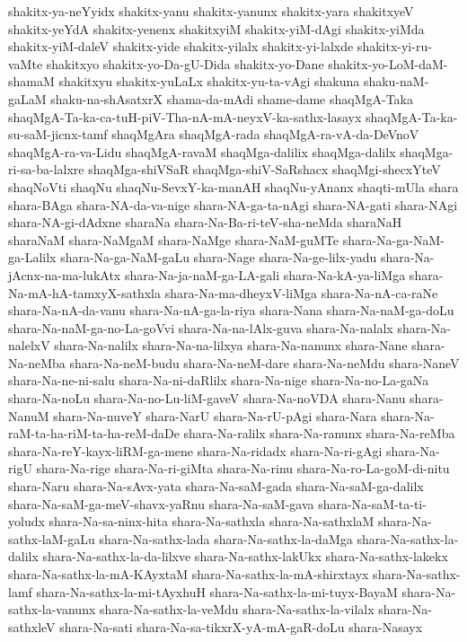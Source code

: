 {shakitx-ya-neYyidx
shakitx-yanu
shakitx-yanunx
shakitx-yara
shakitxyeV
shakitx-yeYdA
shakitx-yenenx
shakitxyiM
shakitx-yiM-dAgi
shakitx-yiMda
shakitx-yiM-daleV
shakitx-yide
shakitx-yilalx
shakitx-yi-lalxde
shakitx-yi-ru-vaMte
shakitxyo
shakitx-yo-Da-gU-Dida
shakitx-yo-Dane
shakitx-yo-LoM-daM-shamaM
shakitxyu
shakitx-yuLaLx
shakitx-yu-ta-vAgi
shakuna
shaku-naM-gaLaM
shaku-na-shAsatxrX
shama-da-mAdi
shame-dame
shaqMgA-Taka
shaqMgA-Ta-ka-ca-tuH-piV-Tha-nA-mA-neyxV-ka-sathx-lasayx
shaqMgA-Ta-ka-su-saM-jicnx-tamf
shaqMgAra
shaqMgA-rada
shaqMgA-ra-vA-da-DeVnoV
shaqMgA-ra-va-Lidu
shaqMgA-ravaM
shaqMga-dalilix
shaqMga-dalilx
shaqMga-ri-sa-ba-lalxre
shaqMga-shiVSaR
shaqMga-shiV-SaRshacx
shaqMgi-shecxYteV
shaqNoVti
shaqNu
shaqNu-SevxY-ka-manAH
shaqNu-yAnanx
shaqti-mUla
shara
shara-BAga
shara-NA-da-va-nige
shara-NA-ga-ta-nAgi
shara-NA-gati
shara-NAgi
shara-NA-gi-dAdxne
sharaNa
shara-Na-Ba-ri-teV-sha-neMda
sharaNaH
sharaNaM
shara-NaMgaM
shara-NaMge
shara-NaM-guMTe
shara-Na-ga-NaM-ga-Lalilx
shara-Na-ga-NaM-gaLu
shara-Nage
shara-Na-ge-lilx-yadu
shara-Na-jAcnx-na-ma-lukAtx
shara-Na-ja-naM-ga-LA-gali
shara-Na-kA-ya-liMga
shara-Na-mA-hA-tamxyX-sathxla
shara-Na-ma-dheyxV-liMga
shara-Na-nA-ca-raNe
shara-Na-nA-da-vanu
shara-Na-nA-ga-la-riya
shara-Nana
shara-Na-naM-ga-doLu
shara-Na-naM-ga-no-La-goVvi
shara-Na-na-lAlx-guva
shara-Na-nalalx
shara-Na-nalelxV
shara-Na-nalilx
shara-Na-na-lilxya
shara-Na-nanunx
shara-Nane
shara-Na-neMba
shara-Na-neM-budu
shara-Na-neM-dare
shara-Na-neMdu
shara-NaneV
shara-Na-ne-ni-salu
shara-Na-ni-daRlilx
shara-Na-nige
shara-Na-no-La-gaNa
shara-Na-noLu
shara-Na-no-Lu-liM-gaveV
shara-Na-noVDA
shara-Nanu
shara-NanuM
shara-Na-nuveY
shara-NarU
shara-Na-rU-pAgi
shara-Nara
shara-Na-raM-ta-ha-riM-ta-ha-reM-daDe
shara-Na-ralilx
shara-Na-ranunx
shara-Na-reMba
shara-Na-reY-kayx-liRM-ga-mene
shara-Na-ridadx
shara-Na-ri-gAgi
shara-Na-rigU
shara-Na-rige
shara-Na-ri-giMta
shara-Na-rinu
shara-Na-ro-La-goM-di-nitu
shara-Naru
shara-Na-sAvx-yata
shara-Na-saM-gada
shara-Na-saM-ga-dalilx
shara-Na-saM-ga-meV-shavx-yaRnu
shara-Na-saM-gava
shara-Na-saM-ta-ti-yoludx
shara-Na-sa-ninx-hita
shara-Na-sathxla
shara-Na-sathxlaM
shara-Na-sathx-laM-gaLu
shara-Na-sathx-lada
shara-Na-sathx-la-daMga
shara-Na-sathx-la-dalilx
shara-Na-sathx-la-da-lilxve
shara-Na-sathx-lakUkx
shara-Na-sathx-lakekx
shara-Na-sathx-la-mA-KAyxtaM
shara-Na-sathx-la-mA-shirxtayx
shara-Na-sathx-lamf
shara-Na-sathx-la-mi-tAyxhuH
shara-Na-sathx-la-mi-tuyx-BayaM
shara-Na-sathx-la-vanunx
shara-Na-sathx-la-veMdu
shara-Na-sathx-la-vilalx
shara-Na-sathxleV
shara-Na-sati
shara-Na-sa-tikxrX-yA-mA-gaR-doLu
shara-Nasayx
}
